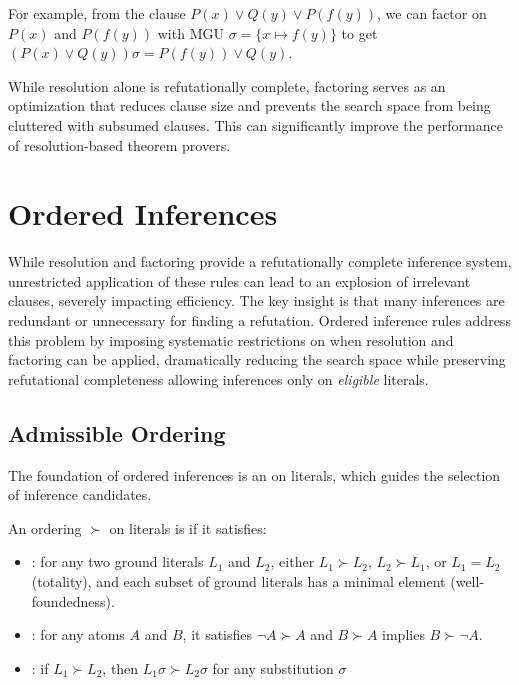 For example, from the clause \(P(x) \lor Q(y) \lor P(f(y))\), we can factor on \(P(x)\) and \(P(f(y))\) with MGU \(\sigma = \{x \mapsto f(y)\}\) to get \((P(x) \lor Q(y))\sigma = P(f(y)) \lor Q(y)\).

While resolution alone is refutationally complete, factoring serves as an optimization that reduces clause size and prevents the search space from being cluttered with subsumed clauses. This can significantly improve the performance of resolution-based theorem provers.

\section{Ordered Inferences}\label{sec:ordered-inferences}

While resolution and factoring provide a refutationally complete inference system, unrestricted application of these rules can lead to an explosion of irrelevant clauses, severely impacting efficiency. The key insight is that many inferences are redundant or unnecessary for finding a refutation.
Ordered inference rules address this problem by imposing systematic restrictions on when resolution and factoring can be applied, dramatically reducing the search space while preserving refutational completeness allowing inferences only on \emph{eligible} literals.

\subsection{Admissible Ordering}\label{subsec:admissible-ordering}

The foundation of ordered inferences is an  on literals, which guides the selection of inference candidates.

An ordering \(\succ\) on literals is  if it satisfies:
\begin{itemize}
    \item {}: for any two ground literals \(L_1\) and \(L_2\), either \(L_1 \succ L_2\), \(L_2 \succ L_1\), or \(L_1 = L_2\) (totality), and each subset of ground literals has a minimal element (well-foundedness).
    \item {}: for any atoms \(A\) and \(B\), it satisfies \(\neg A \succ A\) and \(B \succ A\) implies \(B \succ \neg A\).
    \item {}: if \(L_1 \succ L_2\), then \(L_1\sigma \succ L_2\sigma\) for any substitution \(\sigma\)
\end{itemize}

